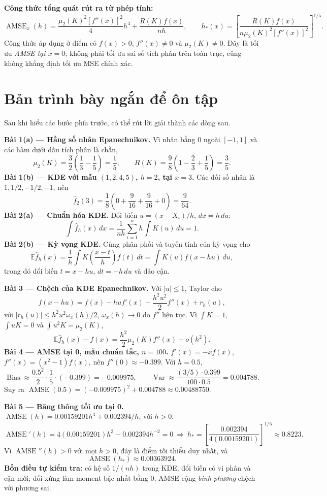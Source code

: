 \documentclass[11pt,a4paper]{article}
\newcommand{\E}{\mathbb E}
\newcommand{\fh}{\widehat f_h}
\DeclareMathOperator{\Var}{Var}
\DeclareMathOperator{\Bias}{Bias}
\DeclareMathOperator{\AMSE}{AMSE}
\begin{document}
\textbf{Công thức tổng quát rút ra từ phép tính:}
\[
\AMSE_x(h)=\frac{\mu_2(K)^2[f''(x)]^2}{4}h^4+\frac{R(K)f(x)}{nh},
\qquad
h_*(x)=\left[\frac{R(K)f(x)}{n\mu_2(K)^2[f''(x)]^2}\right]^{1/5}.
\]
Công thức áp dụng ở điểm có $f(x)>0$, $f''(x)\ne0$ và $\mu_2(K)\ne0$. Đây là tối ưu \emph{AMSE tại $x=0$}; không phải tối ưu sai số tích phân trên toàn trục, cũng không khẳng định tối ưu MSE chính xác.

\clearpage
\section*{Bản trình bày ngắn để ôn tập}
Sau khi hiểu các bước phía trước, có thể rút lời giải thành các dòng sau.

\textbf{Bài 1(a) — Hằng số nhân Epanechnikov.} Vì nhân bằng 0 ngoài $[-1,1]$ và các hàm dưới dấu tích phân là chẵn,
\[
\mu_2(K)=\frac32\left(\frac13-\frac15\right)=\frac15,
\qquad R(K)=\frac98\left(1-\frac23+\frac15\right)=\frac35.
\]
\textbf{Bài 1(b) — KDE với mẫu $(1,2,4,5)$, $h=2$, tại $x=3$.} Các đối số nhân là $1,1/2,-1/2,-1$, nên
\[
\widehat f_2(3)=\frac18\left(0+\frac9{16}+\frac9{16}+0\right)=\frac9{64}.
\]
\textbf{Bài 2(a) — Chuẩn hóa KDE.} Đổi biến $u=(x-X_i)/h$, $dx=h\,du$:
\[
\int\fh(x)\,dx=\frac1{nh}\sum_{i=1}^nh\int K(u)\,du=1.
\]
\textbf{Bài 2(b) — Kỳ vọng KDE.} Cùng phân phối và tuyến tính của kỳ vọng cho
\[
\E\fh(x)=\frac1h\int K\!\left(\frac{x-t}{h}\right)f(t)\,dt
=\int K(u)f(x-hu)\,du,
\]
trong đó đổi biến $t=x-hu$, $dt=-h\,du$ và đảo cận.

\textbf{Bài 3 — Chệch của KDE Epanechnikov.} Với $|u|\leq1$, Taylor cho
\[
f(x-hu)=f(x)-hu f'(x)+\frac{h^2u^2}{2}f''(x)+r_h(u),
\]
với $|r_h(u)|\leq h^2u^2\omega_x(h)/2$, $\omega_x(h)\to0$ do $f''$ liên tục. Vì $\int K=1$, $\int uK=0$ và $\int u^2K=\mu_2(K)$,
\[
\E\fh(x)-f(x)=\frac{h^2}{2}\mu_2(K)f''(x)+o(h^2).
\]
\textbf{Bài 4 — AMSE tại 0, mẫu chuẩn tắc, $n=100$.} $f'(x)=-xf(x)$, $f''(x)=(x^2-1)f(x)$, nên $f''(0)\approx-0.399$. Với $h=0.5$,
\[
\Bias\approx\frac{0.5^2}{2}\cdot\frac15\cdot(-0.399)=-0.009975,
\qquad \Var\approx\frac{(3/5)\cdot0.399}{100\cdot0.5}=0.004788.
\]
Suy ra $\AMSE(0.5)=(-0.009975)^2+0.004788\approx0.00488750$.

\textbf{Bài 5 — Băng thông tối ưu tại 0.} $\AMSE(h)=0.00159201h^4+0.002394/h$, với $h>0$.
\[
\AMSE'(h)=4(0.00159201)h^3-0.002394h^{-2}=0
\ \Longrightarrow\ 
h_* =\left[\frac{0.002394}{4(0.00159201)}\right]^{1/5}\approx0.8223.
\]
Vì $\AMSE''(h)>0$ với mọi $h>0$, đây là điểm tối thiểu duy nhất, và
\[
\boxed{\AMSE(h_*)\approx0.00363924.}
\]
\vfill
\textbf{Bốn điều tự kiểm tra:} có hệ số $1/(nh)$ trong KDE; đổi biến có vi phân và cận mới; đối xứng làm moment bậc nhất bằng 0; AMSE cộng \emph{bình phương} chệch với phương sai.
\end{document}

